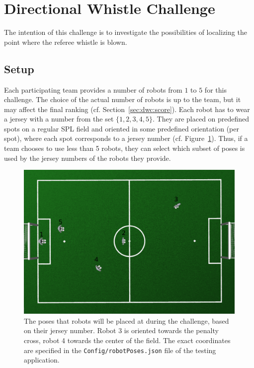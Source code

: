 \documentclass[12pt]{article}
\newcommand{\cf}{\mbox{cf.}\xspace}
\begin{document}
\newpage

\section{Directional Whistle Challenge}

The intention of this challenge is to investigate the possibilities of localizing the point where the referee whistle is blown.

\subsection{Setup}
\label{sec:dwc:setup}
Each participating team provides a number of robots from \(1\) to \(5\) for this challenge. The choice of the actual number of robots is up to the team, but it may affect the final ranking (\cf Section~\ref{sec:dwc:score}). Each robot has to wear a jersey with a number from the set \(\{1,2,3,4,5\}\). They are placed on predefined spots on a regular SPL field and oriented in some predefined orientation (per spot), where each spot corresponds to a jersey number (\cf Figure~\ref{fig:dwc:poses}). Thus, if a team chooses to use less than 5 robots, they can select which subset of poses is used by the jersey numbers of the robots they provide.

\begin{figure}[b!]
  \centerline{\includegraphics[width=\columnwidth]{figs/dwc-poses}}
  \caption{The poses that robots will be placed at during the challenge, based on their jersey number. Robot 3 is oriented towards the penalty cross, robot 4 towards the center of the field. The exact coordinates are specified in the \texttt{Config/robotPoses.json} file of the testing application.}
  \label{fig:dwc:poses}
\end{figure}
\end{document}
